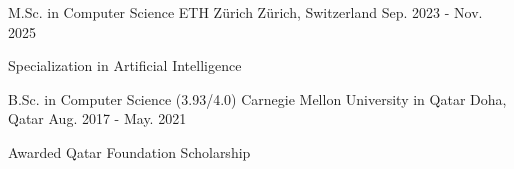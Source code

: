 

\begin{cventries}

\cventry
{M.Sc. in Computer Science} %
{ETH Zürich} %
{Zürich, Switzerland} %
{Sep. 2023 - Nov. 2025} %
{
  \begin{cvitems} %
    \item {Specialization in Artificial Intelligence}
  \end{cvitems}
}

\cventry
{B.Sc. in Computer Science (3.93/4.0)} %
{Carnegie Mellon University in Qatar} %
{Doha, Qatar} %
{Aug. 2017 - May. 2021} %
{
  \begin{cvitems} %
    \item {Awarded Qatar Foundation Scholarship}
  \end{cvitems}
}

\end{cventries}
